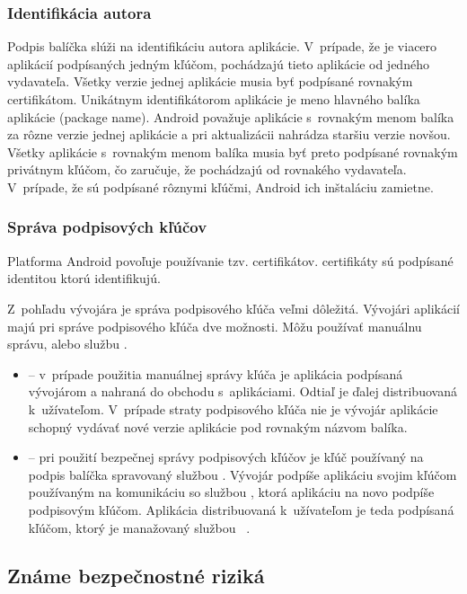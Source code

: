 \subsubsection{\textbf{Identifikácia autora}}
Podpis balíčka slúži na identifikáciu autora aplikácie. V~prípade, že je viacero aplikácií podpísaných jedným kľúčom, pochádzajú tieto aplikácie od jedného vydavateľa. 
Všetky verzie jednej aplikácie musia byť podpísané rovnakým certifikátom. Unikátnym identifikátorom aplikácie je meno hlavného balíka aplikácie (package name). Android považuje aplikácie s~rovnakým menom balíka za rôzne verzie jednej aplikácie a pri aktualizácii nahrádza staršiu verzie novšou. Všetky aplikácie s~rovnakým menom balíka musia byť preto podpísané rovnakým privátnym kľúčom, čo zaručuje, že pochádzajú od rovnakého vydavateľa.  V~prípade, že sú podpísané rôznymi kľúčmi, Android ich inštaláciu zamietne. 

\subsubsection{\textbf{Správa podpisových kľúčov}}
Platforma Android povoľuje používanie tzv.  certifikátov.  certifikáty sú podpísané identitou ktorú identifikujú. 

Z~pohľadu vývojára je správa podpisového kľúča veľmi dôležitá. Vývojári aplikácií majú pri správe podpisového kľúča dve možnosti. Môžu používať manuálnu správu, alebo službu . 
\begin{itemize}
	\item {} -- v~prípade použitia manuálnej správy kľúča je aplikácia podpísaná vývojárom a nahraná do obchodu s~aplikáciami. Odtiaľ je ďalej distribuovaná k~užívateľom. V~prípade straty podpisového kľúča nie je vývojár aplikácie schopný vydávať nové verzie aplikácie pod rovnakým názvom balíka.
	\item {} -- pri použití bezpečnej správy podpisových kľúčov  je kľúč používaný na podpis balíčka spravovaný službou  . Vývojár podpíše aplikáciu svojim kľúčom používaným na komunikáciu so službou  , ktorá aplikáciu na novo podpíše podpisovým kľúčom. Aplikácia distribuovaná k~užívateľom je teda podpísaná kľúčom, ktorý je manažovaný službou ~\cite{NT0FrzQIkOAYbG2G}. 
\end{itemize}


\subsection{Známe bezpečnostné riziká}

